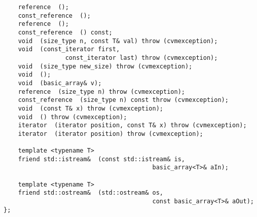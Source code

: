 \verb"    reference "\verb" ();"\\
\verb"    const_reference "\verb" ();"\\
\verb"    reference "\verb" ();"\\
\verb"    const_reference "\verb" () const;"\\
\verb"    void "\verb" (size_type n, const T& val) throw (cvmexception);"\\
\verb"    void "\verb" (const_iterator first,"\\
\verb"                 const_iterator last) throw (cvmexception);"\\
\verb"    void "\verb" (size_type new_size) throw (cvmexception);"\\
\verb"    void "\verb" ();"\\
\verb"    void "\verb" (basic_array& v);"\\
\verb"    reference "\verb" (size_type n) throw (cvmexception);"\\
\verb"    const_reference "\verb" (size_type n) const throw (cvmexception);"\\
\verb"    void "\verb" (const T& x) throw (cvmexception);"\\
\verb"    void "\verb" () throw (cvmexception);"\\
\verb"    iterator "\verb" (iterator position, const T& x) throw (cvmexception);"\\
\verb"    iterator "\verb" (iterator position) throw (cvmexception);"\\
\verb" "\\
\verb"    template <typename T>"\\
\verb"    friend std::istream& "\verb" (const std::istream& is,"\\
\verb"                                         basic_array<T>& aIn);"\\
\verb" "\\
\verb"    template <typename T>"\\
\verb"    friend std::ostream& "\verb" (std::ostream& os,"\\
\verb"                                         const basic_array<T>& aOut);"\\
\verb"};"
\newpage



